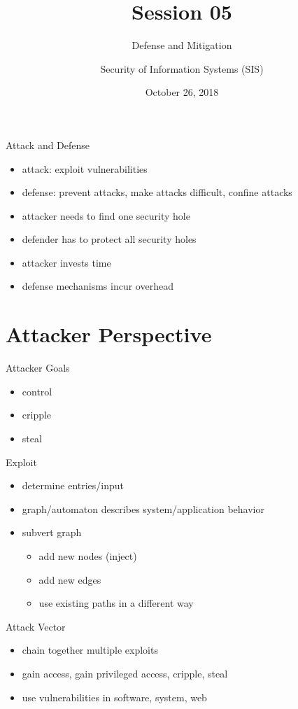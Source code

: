 \documentclass{curs}
\title[Session 05]{Session 05}
\subtitle{Defense and Mitigation}
\author{Security of Information Systems (SIS)}
\date{October 26, 2018}
\begin{document}
\frame{\titlepage}

\begin{frame}{Attack and Defense}
  \begin{itemize}
    \item attack: exploit vulnerabilities
    \item defense: prevent attacks, make attacks difficult, confine attacks
    \item attacker needs to find one security hole
    \item defender has to protect all security holes
    \item attacker invests time
    \item defense mechanisms incur overhead
  \end{itemize}
\end{frame}


\section{Attacker Perspective}

\begin{frame}{Attacker Goals}
  \begin{itemize}
    \item control
    \item cripple
    \item steal
  \end{itemize}
\end{frame}

\begin{frame}{Exploit}
  \begin{itemize}
    \item determine entries/input
    \item graph/automaton describes system/application behavior
    \item subvert graph
      \begin{itemize}
        \item add new nodes (inject)
        \item add new edges
        \item use existing paths in a different way
      \end{itemize}
  \end{itemize}
\end{frame}

\begin{frame}{Attack Vector}
  \begin{itemize}
    \item chain together multiple exploits
    \item gain access, gain privileged access, cripple, steal
    \item use vulnerabilities in software, system, web
  \end{itemize}
\end{frame}
\end{document}
